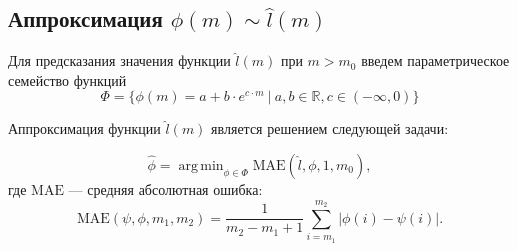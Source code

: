 \documentclass[12pt, a4paper]{scrartcl}
\DeclareMathOperator*{\argmin}{arg\,min}
\theoremstyle{plain}
\theoremstyle{definition}
\begin{document}
\subsection{Аппроксимация $\phi(m) \sim \hat{l}(m)$}

Для предсказания значения функции $\hat{l}(m)$ при $m > m_0$ введем параметрическое семейство функций 
\begin{equation}\label{Phi}
\Phi = \{\phi(m) =  a + b\cdot e^{c \cdot m} ~|~ a, b \in \mathbb{R}, c \in (-\infty, 0)\}
\end{equation}

Аппроксимация функции  $\hat{l}(m)$ является решением следующей задачи:

\begin{equation}\label{argmin_MAPE}
\hat{\phi} =  \argmin_{\phi \in \Phi}\text{MAE}(\hat{l}, \phi, 1, m_0),
\end{equation}
где $\text{MAE}$ --- средняя абсолютная ошибка:
\begin{equation}\label{MAPE}
\text{MAE}(\psi, \phi, m_1, m_2) = \frac{1}{m_2 - m_1 + 1}\sum_{i=m_1}^{m_2}|\phi(i) - \psi(i)|.
\end{equation}











\end{document}
